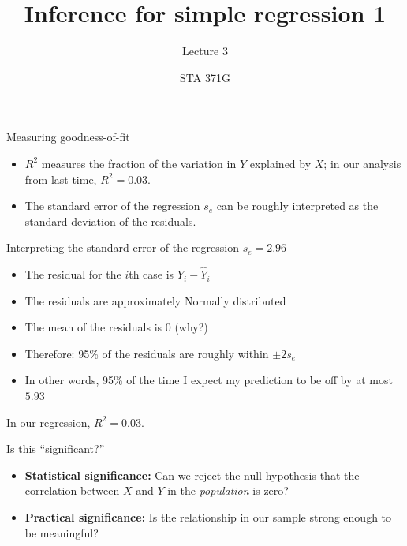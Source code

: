 \documentclass{beamer}\usepackage[]{graphicx}\usepackage[]{color}
\title{Inference for simple regression 1}
\subtitle{Lecture 3}
\author{STA 371G}
\begin{document}
  
  
  

  \frame{\maketitle}



  \begin{darkframes}
    \begin{frame}{Measuring goodness-of-fit}
      \begin{itemize}[<+->]
        \item $R^2$ measures the fraction of the variation in $Y$ explained by $X$;
        in our analysis from last time, $R^2=0.03$.
        \item The \alert{standard error of the regression} $s_e$ can be roughly interpreted as
        the standard deviation of the residuals.
      \end{itemize}
    \end{frame}

    \begin{frame}{Interpreting the standard error of the regression $s_e = 2.96$}
      \begin{itemize}[<+->]
        \item The \alert{residual} for the $i$th case is $Y_i - \hat Y_i$
        \item The residuals are approximately Normally distributed
        \item The mean of the residuals is 0 (why?)
        \item Therefore: 95\% of the residuals are roughly within $\pm 2 s_e$
        \item In other words, 95\% of the time I expect my prediction to be off by at most $5.93$
      \end{itemize}
    \end{frame}

    \begin{frame}
      In our regression, $R^2=0.03$.

      Is this ``significant?''
      \pause
      \begin{itemize}[<+->]
        \item \textbf{Statistical significance:} Can we reject the null hypothesis that the correlation between $X$ and $Y$ in the \emph{population} is zero?
        \item \textbf{Practical significance:} Is the relationship in our sample strong enough to be meaningful?
      \end{itemize}
    \end{frame}


\end{darkframes}
\end{document}
